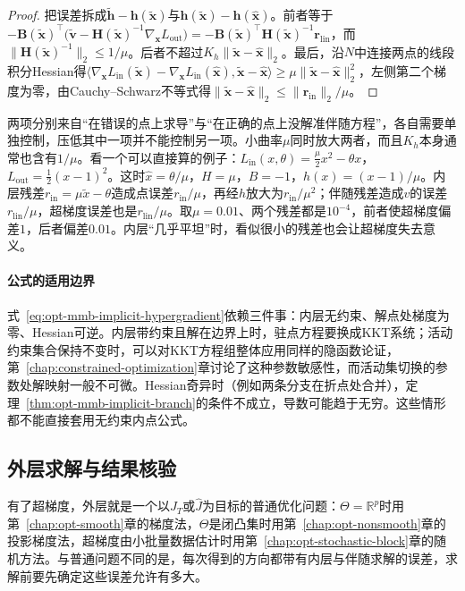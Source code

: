 \begin{proof}
把误差拆成$\tilde{\bm h}-\bm h(\tilde{\bm x})$与$\bm h(\tilde{\bm x})-\bm h(\hat{\bm x})$。前者等于$-\bm B(\tilde{\bm x})^\top\bigl(\tilde{\bm v}-\bm H(\tilde{\bm x})^{-1}\nabla_{\bm x}L_{\mathrm{out}}\bigr)=-\bm B(\tilde{\bm x})^\top\bm H(\tilde{\bm x})^{-1}\bm r_{\mathrm{lin}}$，而$\lVert\bm H(\tilde{\bm x})^{-1}\rVert_2\leq1/\mu$。后者不超过$K_h\lVert\tilde{\bm x}-\hat{\bm x}\rVert_2$。最后，沿$N$中连接两点的线段积分Hessian得$\langle\nabla_{\bm x}L_{\mathrm{in}}(\tilde{\bm x})-\nabla_{\bm x}L_{\mathrm{in}}(\hat{\bm x}),\tilde{\bm x}-\hat{\bm x}\rangle\geq\mu\lVert\tilde{\bm x}-\hat{\bm x}\rVert_2^2$，左侧第二个梯度为零，由Cauchy--Schwarz不等式得$\lVert\tilde{\bm x}-\hat{\bm x}\rVert_2\leq\lVert\bm r_{\mathrm{in}}\rVert_2/\mu$。
\end{proof}

两项分别来自“在错误的点上求导”与“在正确的点上没解准伴随方程”，各自需要单独控制，压低其中一项并不能控制另一项。小曲率$\mu$同时放大两者，而且$K_h$本身通常也含有$1/\mu$。看一个可以直接算的例子：$L_{\mathrm{in}}(x,\theta)=\frac\mu2x^2-\theta x$，$L_{\mathrm{out}}=\frac12(x-1)^2$。这时$\hat x=\theta/\mu$，$H=\mu$，$B=-1$，$h(x)=(x-1)/\mu$。内层残差$r_{\mathrm{in}}=\mu\tilde x-\theta$造成点误差$r_{\mathrm{in}}/\mu$，再经$h$放大为$r_{\mathrm{in}}/\mu^2$；伴随残差造成$v$的误差$r_{\mathrm{lin}}/\mu$，超梯度误差也是$r_{\mathrm{lin}}/\mu$。取$\mu=0.01$、两个残差都是$10^{-4}$，前者使超梯度偏差$1$，后者偏差$0.01$。内层“几乎平坦”时，看似很小的残差也会让超梯度失去意义。

\paragraph{公式的适用边界}
式~\eqref{eq:opt-mmb-implicit-hypergradient}依赖三件事：内层无约束、解点处梯度为零、Hessian可逆。内层带约束且解在边界上时，驻点方程要换成KKT系统；活动约束集合保持不变时，可以对KKT方程组整体应用同样的隐函数论证，第~\ref{chap:constrained-optimization}章讨论了这种参数敏感性，而活动集切换的参数处解映射一般不可微。Hessian奇异时（例如两条分支在折点处合并），定理~\ref{thm:opt-mmb-implicit-branch}的条件不成立，导数可能趋于无穷。这些情形都不能直接套用无约束内点公式。

\subsection{外层求解与结果核验}
\label{sec:opt-mmb-outer}

有了超梯度，外层就是一个以$J_T$或$\widehat J$为目标的普通优化问题：$\Theta=\mathbb R^p$时用第~\ref{chap:opt-smooth}章的梯度法，$\Theta$是闭凸集时用第~\ref{chap:opt-nonsmooth}章的投影梯度法，超梯度由小批量数据估计时用第~\ref{chap:opt-stochastic-block}章的随机方法。与普通问题不同的是，每次得到的方向都带有内层与伴随求解的误差，求解前要先确定这些误差允许有多大。

